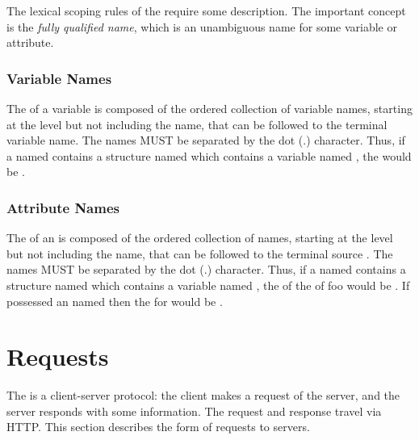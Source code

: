 \documentclass[justify]{nasa-ese}
\renewcommand{\new}[1]{\emph{#1}}
\begin{document}
The lexical scoping rules of the \DAP require some description. The
important concept is the \new{fully qualified name}, which is an
unambiguous name for some variable or attribute.

\subsubsection{Variable Names}

The \FQN of a variable is composed of the ordered collection of variable
names, starting at the \Dataset level but not including the \Dataset name,
that can be followed to the terminal variable name. The names MUST be
separated by the dot (.) character. Thus, if a \Dataset named 
contains a structure named  which contains a variable named
, the \FQN would be .

\subsubsection{Attribute Names}

The \FQN of an \Attribute is composed of the ordered collection of \Attribute
names, starting at the \Dataset level but not including the \Dataset name,
that can be followed to the terminal source \Attribute. The names MUST be
separated by the dot (.) character. Thus, if a \Dataset named 
contains a structure named  which contains a variable named
, the \FQN of the \Attributes of foo would be . If
 possessed an \Attribute named  then the \FQN for
 would be .





\section{Requests}
\label{sec-requests}

The \DAP is a client-server protocol: the client makes a request
of the server, and the server responds with some information.  The
request and response travel via \ac{HTTP}.  This section describes the form
of requests to servers.
\end{document}
